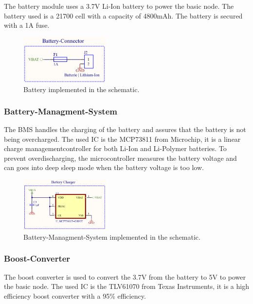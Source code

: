         The battery module uses a 3.7V Li-Ion battery to power the basic node. The battery 
        used is a 21700 cell with a capacity of 4800mAh. The battery is secured with a 1A fuse.
 
        \begin{figure}[H]
            \centering
            \includegraphics[width=0.4\textwidth]{assets/HW/BatteryV2.2_Battery-Terminal.png}
            \caption{Battery implemented in the schematic.}
        \end{figure}

    \subsubsection{Battery-Managment-System}

        The BMS handles the charging of the battery and assures that the battery is not
        being overcharged. The used IC is the MCP73811 from Microchip, it is a linear 
        charge managementcontroller for both Li-Ion and Li-Polymer batteries. 
        To prevent overdischarging, the microcontroller measures the battery voltage
        and can goes into deep sleep mode when the battery voltage is too low.

        \begin{figure}[H]
        \centering
        \includegraphics[width=0.4\textwidth]{assets/HW/Battery-ChargerIC.png}
        \caption{Battery-Managment-System implemented in the schematic.}
        \end{figure}

    \subsubsection{Boost-Converter}

        The boost converter is used to convert the 3.7V from the battery to 5V to power the 
        basic node. The used IC is the TLV61070 from Texas Instruments, it is a high efficiency
        boost converter with a 95\% efficiency.

